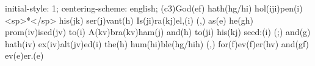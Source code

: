 initial-style: 1;
centering-scheme: english;
(c3)God(ef) hath(hg/hi) hol(iji)pen(i) <sp>*</sp> his(jk) ser(j)vant(h) Is(ji)ra(kj)el,(i) (,) as(e) he(gh) prom(iv)ised(jv) to(i) A(kv)bra(kv)ham(j) and(h) to(ji) his(kj) seed:(i) (;) and(g) hath(iv) ex(iv)alt(jv)ed(i) the(h) hum(hi)ble(hg/hih) (,) for(f)ev(f)er(hv) and(gf) ev(e)er.(e)
